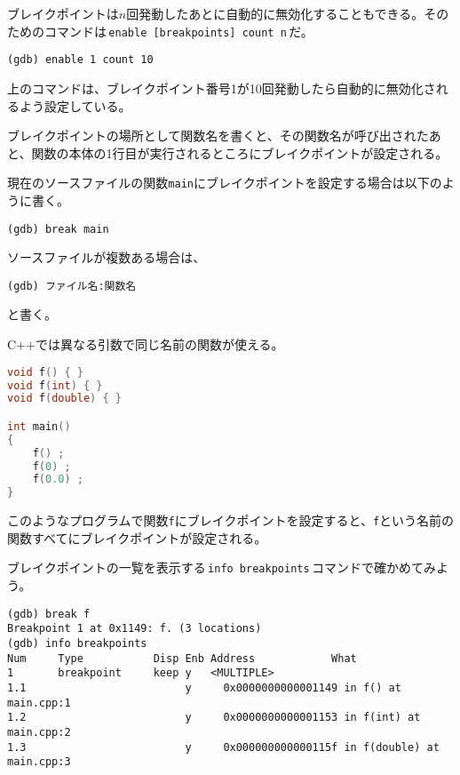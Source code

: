 ブレイクポイントは\(n\)回発動したあとに自動的に無効化することもできる。そのためのコマンドは\,\texttt{enable [breakpoints] count n}\,だ。

\begin{lstlisting}[style=terminal]
(gdb) enable 1 count 10
\end{lstlisting}

上のコマンドは、ブレイクポイント番号1が10回発動したら自動的に無効化されるよう設定している。


ブレイクポイントの場所として関数名を書くと、その関数名が呼び出されたあと、関数の本体の1行目が実行されるところにブレイクポイントが設定される。

現在のソースファイルの関数\texttt{main}にブレイクポイントを設定する場合は以下のように書く。

\begin{lstlisting}[style=terminal]
(gdb) break main
\end{lstlisting}

ソースファイルが複数ある場合は、
\begin{lstlisting}[style=terminal]
(gdb) ファイル名:関数名
\end{lstlisting}
と書く。

C++では異なる引数で同じ名前の関数が使える。

\begin{lstlisting}[language={C++}]
void f() { }
void f(int) { }
void f(double) { }

int main()
{
    f() ;
    f(0) ;
    f(0.0) ;
}
\end{lstlisting}

このようなプログラムで関数\texttt{f}にブレイクポイントを設定すると、\texttt{f}という名前の関数すべてにブレイクポイントが設定される。

ブレイクポイントの一覧を表示する\,\texttt{info breakpoints}\,コマンドで確かめてみよう。

\begin{lstlisting}[style=terminal]
(gdb) break f
Breakpoint 1 at 0x1149: f. (3 locations)
(gdb) info breakpoints 
Num     Type           Disp Enb Address            What
1       breakpoint     keep y   <MULTIPLE>         
1.1                         y     0x0000000000001149 in f() at main.cpp:1
1.2                         y     0x0000000000001153 in f(int) at main.cpp:2
1.3                         y     0x000000000000115f in f(double) at main.cpp:3
\end{lstlisting}

